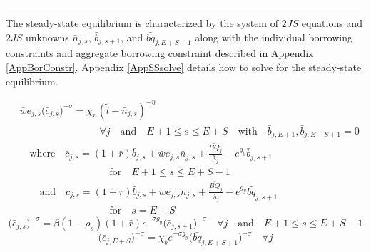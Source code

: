 \documentclass[letterpaper,12pt]{article}
\theoremstyle{definition}
\begin{document}
    \hrule
    \begin{spacing}{1.5}
    \vspace{10mm}

    The steady-state equilibrium is characterized by the system of $2JS$ equations and $2JS$ unknowns $\bar{n}_{j,s}$, $\bar{b}_{j,s+1}$, and $\bar{bq}_{j,E+S+1}$ along with the individual borrowing constraints and aggregate borrowing constraint described in Appendix \ref{AppBorConstr}. Appendix \ref{AppSSsolve} details how to solve for the steady-state equilibrium.

    \begin{equation}\label{EqEulerLabSS}
      \begin{split}
        &\bar{w}e_{j,s}\bigl(\bar{c}_{j,s}\bigr)^{-\sigma} = \chi_n (\tilde{l} - \bar{n}_{j,s})^{-\eta} \\
        &\quad\quad\quad\quad\quad\quad\quad\quad\forall j \quad\text{and}\quad E+1\leq s\leq E+S \quad\text{with}\quad \bar{b}_{j,E+1},\bar{b}_{j,E+S+1}=0 \\
        &\quad\text{where}\quad \bar{c}_{j,s} = \left(1+\bar{r}\right)\bar{b}_{j,s} + \bar{w}e_{j,s}\bar{n}_{j,s} + \frac{\bar{BQ}_{j}}{\lambda_j} - e^{g_y}\bar{b}_{j,s+1} \\
        &\quad\quad\quad\quad\quad\quad\quad\quad\quad\text{for}\quad E+1\leq s\leq E+S-1 \\
        &\quad\quad\text{and}\quad \bar{c}_{j,s} = \left(1+\bar{r}\right)\bar{b}_{j,s} + \bar{w}e_{j,s}\bar{n}_{j,s} + \frac{\bar{BQ}_{j}}{\lambda_j} - e^{g_y}\bar{bq}_{j,s+1} \\
        &\quad\quad\quad\quad\quad\quad\quad\quad\quad\text{for}\quad s=E+S
      \end{split}
    \end{equation}
    \begin{equation}\label{EqEulerSavSS}
      \bigl(\bar{c}_{j,s}\bigr)^{-\sigma} = \beta(1-\rho_s)(1+\bar{r})e^{-\sigma g_y}\bigl(\bar{c}_{j,s+1}\bigr)^{-\sigma}\quad\forall j \quad\text{and}\quad E+1\leq s\leq E+S-1
    \end{equation}
    \begin{equation}\label{EqEulerBeqSS}
      \bigl(\bar{c}_{j,E+S}\bigr)^{-\sigma} = \chi_b e^{-\sigma g_y}\bigl(\bar{bq}_{j,E+S+1}\bigr)^{-\sigma} \quad\forall j
    \end{equation}


\end{spacing}
\end{document}
